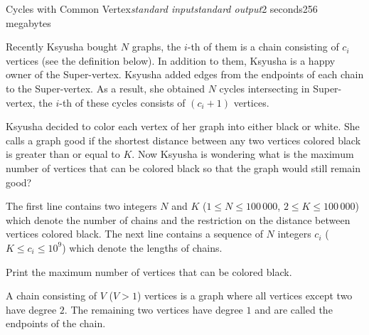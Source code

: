 \begin{problem}{Cycles with Common Vertex}{\textsl{standard input}}{\textsl{standard output}}{2 seconds}{256 megabytes}

Recently Ksyusha bought $N$ graphs, the $i$-th of them is a chain consisting of $c_i$ vertices (see the definition below). In addition to them, Ksyusha is a happy owner of the Super-vertex. Ksyusha added edges from the endpoints of each chain to the Super-vertex. As a result, she obtained $N$ cycles intersecting in Super-vertex, the $i$-th of these cycles consists of $(c_{i} + 1)$ vertices.

Ksyusha decided to color each vertex of her graph into either black or white. She calls a graph good if the shortest distance between any two vertices colored black is greater than or equal to $K$. Now Ksyusha is wondering what is the maximum number of vertices that can be colored black so that the graph would still remain good?

\InputFile
The first line contains two integers $N$ and $K$ ($1 \le N \le 100\,000$, $2 \le K \le 100\,000$) which denote the number of chains and the restriction on the distance between vertices colored black. The next line contains a sequence of $N$ integers $c_i$ ($K \le c_i \le 10^9$) which denote the lengths of chains.


\OutputFile
Print the maximum number of vertices that can be colored black. 

\Examples

\begin{example}
%
%
\end{example}

\Note
A chain consisting of $V$ ($V > 1$) vertices is a graph where all vertices except two have degree $2$. The remaining two vertices have degree $1$ and are called the endpoints of the chain.

\end{problem}
